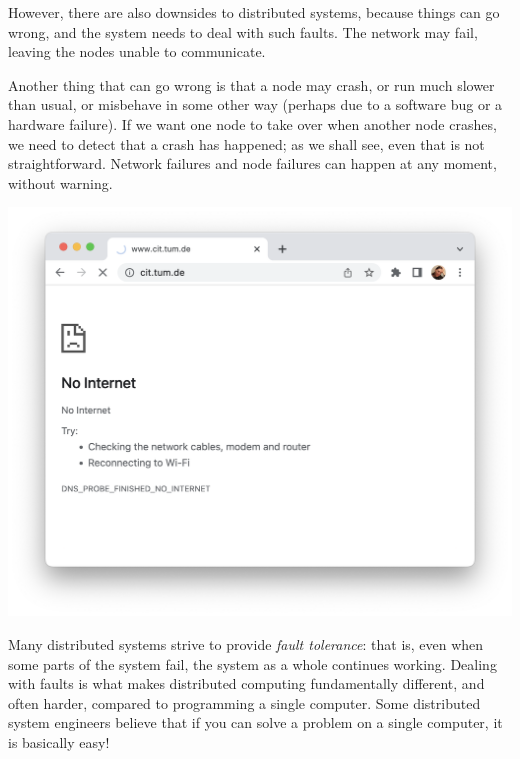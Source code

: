 However, there are also downsides to distributed systems, because things can go wrong, and the system needs to deal with such faults.
The network may fail, leaving the nodes unable to communicate.

Another thing that can go wrong is that a node may crash, or run much slower than usual, or misbehave in some other way (perhaps due to a software bug or a hardware failure).
If we want one node to take over when another node crashes, we need to detect that a crash has happened; as we shall see, even that is not straightforward.
Network failures and node failures can happen at any moment, without warning.

\begin{frame}[plain]
    \label{s:no-internet}
    \includegraphics[height=\paperheight]{images/no-internet.png}
\end{frame}

Many distributed systems strive to provide \emph{fault tolerance}: that is, even when some parts of the system fail, the system as a whole continues working.
Dealing with faults is what makes distributed computing fundamentally different, and often harder, compared to programming a single computer.
Some distributed system engineers believe that if you can solve a problem on a single computer, it is basically easy!


